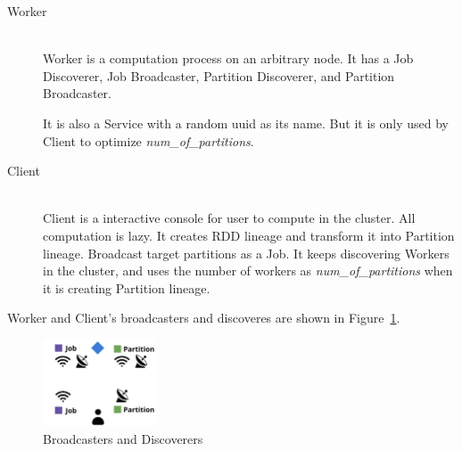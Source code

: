 \begin{description}
    \item[Worker] \hfill \\
    Worker is a computation process on an arbitrary node.
    It has a Job Discoverer, Job Broadcaster, Partition Discoverer, and Partition Broadcaster.

    It is also a Service with a random uuid as its name.
    But it is only used by Client to optimize \emph{num\_of\_partitions}.

    \item[Client] \hfill \\
    Client is a interactive console for user to compute in the cluster.
    All computation is lazy.
    It creates RDD lineage and transform it into Partition lineage.
    Broadcast target partitions as a Job.
    It keeps discovering Workers in the cluster, and uses the number of workers as \emph{num\_of\_partitions} when it is creating Partition lineage.
\end{description}

Worker and Client's broadcasters and discoveres are shown in Figure~\ref{fig:broadcaster}.

\begin{figure}[htb]
    \centering
    \includegraphics[width=0.3\textwidth]{images/broadcaster.png}
    \caption{Broadcasters and Discoverers}\label{fig:broadcaster}
\end{figure}

